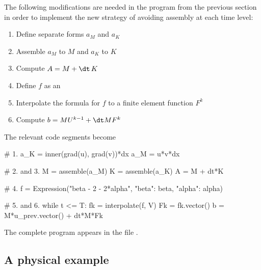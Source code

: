 The following modifications are needed in the 
program from the previous section in order to implement the new
strategy of avoiding assembly at each time level:
\begin{enumerate}
\item Define separate forms $a_M$ and $a_K$
\item Assemble $a_M$ to $M$ and $a_K$ to $K$
\item Compute $A=M+{\dt}\, K$
\item Define $f$ as an 
\item Interpolate the formula for $f$ to a finite element function $F^k$
\item Compute $b=MU^{k-1} + {\dt}MF^k$
\end{enumerate}
The relevant code segments become
\begin{python}
# 1.
a_K = inner(grad(u), grad(v))*dx
a_M = u*v*dx

# 2. and 3.
M = assemble(a_M)
K = assemble(a_K)
A = M + dt*K

# 4.
f = Expression("beta - 2 - 2*alpha", {"beta": beta, "alpha": alpha})

# 5. and 6.
while t <= T:
    fk = interpolate(f, V)
    Fk = fk.vector()
    b = M*u_prev.vector() + dt*M*Fk
\end{python}
The complete program appears in the file .

\subsection{A physical example}
\label{langtangen:timedep:diffusion2:sin}

